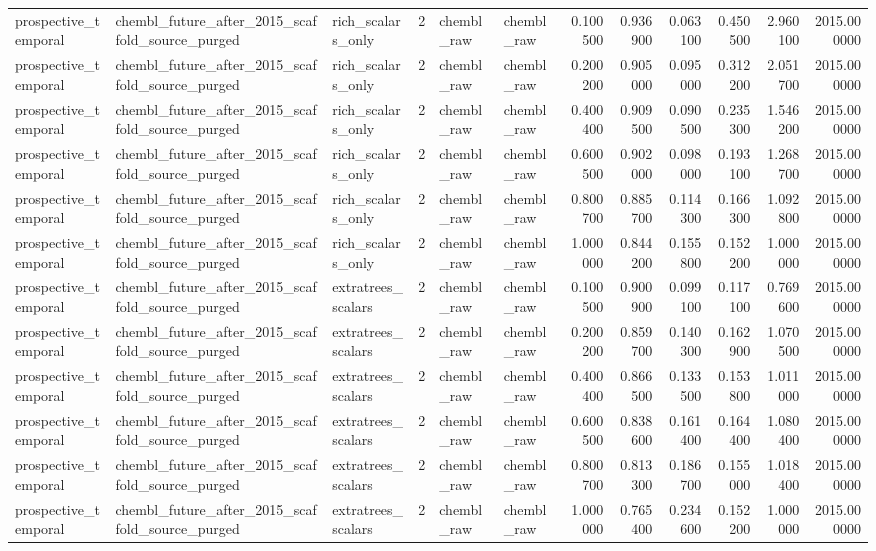 \begin{longtable}{lllrllrrrrrr}
prospective\_temporal & chembl\_future\_after\_2015\_scaffold\_source\_purged & rich\_scalars\_only & 2 & chembl\_raw & chembl\_raw & 0.100500 & 0.936900 & 0.063100 & 0.450500 & 2.960100 & 2015.000000 \\
prospective\_temporal & chembl\_future\_after\_2015\_scaffold\_source\_purged & rich\_scalars\_only & 2 & chembl\_raw & chembl\_raw & 0.200200 & 0.905000 & 0.095000 & 0.312200 & 2.051700 & 2015.000000 \\
prospective\_temporal & chembl\_future\_after\_2015\_scaffold\_source\_purged & rich\_scalars\_only & 2 & chembl\_raw & chembl\_raw & 0.400400 & 0.909500 & 0.090500 & 0.235300 & 1.546200 & 2015.000000 \\
prospective\_temporal & chembl\_future\_after\_2015\_scaffold\_source\_purged & rich\_scalars\_only & 2 & chembl\_raw & chembl\_raw & 0.600500 & 0.902000 & 0.098000 & 0.193100 & 1.268700 & 2015.000000 \\
prospective\_temporal & chembl\_future\_after\_2015\_scaffold\_source\_purged & rich\_scalars\_only & 2 & chembl\_raw & chembl\_raw & 0.800700 & 0.885700 & 0.114300 & 0.166300 & 1.092800 & 2015.000000 \\
prospective\_temporal & chembl\_future\_after\_2015\_scaffold\_source\_purged & rich\_scalars\_only & 2 & chembl\_raw & chembl\_raw & 1.000000 & 0.844200 & 0.155800 & 0.152200 & 1.000000 & 2015.000000 \\
prospective\_temporal & chembl\_future\_after\_2015\_scaffold\_source\_purged & extratrees\_scalars & 2 & chembl\_raw & chembl\_raw & 0.100500 & 0.900900 & 0.099100 & 0.117100 & 0.769600 & 2015.000000 \\
prospective\_temporal & chembl\_future\_after\_2015\_scaffold\_source\_purged & extratrees\_scalars & 2 & chembl\_raw & chembl\_raw & 0.200200 & 0.859700 & 0.140300 & 0.162900 & 1.070500 & 2015.000000 \\
prospective\_temporal & chembl\_future\_after\_2015\_scaffold\_source\_purged & extratrees\_scalars & 2 & chembl\_raw & chembl\_raw & 0.400400 & 0.866500 & 0.133500 & 0.153800 & 1.011000 & 2015.000000 \\
prospective\_temporal & chembl\_future\_after\_2015\_scaffold\_source\_purged & extratrees\_scalars & 2 & chembl\_raw & chembl\_raw & 0.600500 & 0.838600 & 0.161400 & 0.164400 & 1.080400 & 2015.000000 \\
prospective\_temporal & chembl\_future\_after\_2015\_scaffold\_source\_purged & extratrees\_scalars & 2 & chembl\_raw & chembl\_raw & 0.800700 & 0.813300 & 0.186700 & 0.155000 & 1.018400 & 2015.000000 \\
prospective\_temporal & chembl\_future\_after\_2015\_scaffold\_source\_purged & extratrees\_scalars & 2 & chembl\_raw & chembl\_raw & 1.000000 & 0.765400 & 0.234600 & 0.152200 & 1.000000 & 2015.000000 \\
\end{longtable}
